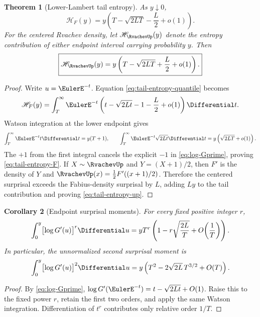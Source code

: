 \documentclass[11pt,oneside]{article}
\newtheorem{theorem}{Theorem}[section]
\newtheorem{corollary}[theorem]{Corollary}
\theoremstyle{definition}
\theoremstyle{remark}
\begin{document}
\begin{theorem}[Lower-Lambert tail entropy]
\label{thm:tail-entropy}
As $y\downarrow0$,
\begin{equation}
 \boxed{
 \mathscr H_F(y)
 =y\left(T-\sqrt{2LT}-\frac L2+o(1)\right).}
 \label{eq:tail-entropy-F}
\end{equation}
For the centered Rvachev density, let $\mathscr H_{\RvachevUp}(y)$ denote the entropy
contribution of either endpoint interval carrying probability $y$.  Then
\begin{equation}
 \boxed{
 \mathscr H_{\RvachevUp}(y)
 =y\left(T-\sqrt{2LT}+\frac L2+o(1)\right).}
 \label{eq:tail-entropy-up}
\end{equation}
\end{theorem}

\begin{proof}
Write $u=\EulerE^{-t}$.  Equation \eqref{eq:tail-entropy-quantile} becomes
\[
 \mathscr H_F(y)=\int_T^\infty \EulerE^{-t}
 \left(t-\sqrt{2Lt}-1-\frac L2+o(1)\right)\Differential t.
\]
Watson integration at the lower endpoint gives
\[
 \int_T^\infty\EulerE^{-t}t\Differential t=y(T+1),
 \qquad
 \int_T^\infty\EulerE^{-t}\sqrt{2Lt}\Differential t
 =y\left(\sqrt{2LT}+o(1)\right).
\]
The $+1$ from the first integral cancels the explicit $-1$ in
\eqref{eq:log-Gprime}, proving \eqref{eq:tail-entropy-F}.  If
$X\sim\RvachevUp$ and $Y=(X+1)/2$, then $F'$ is the density of $Y$ and
$\RvachevUp(x)=\tfrac12F'((x+1)/2)$.  Therefore the centered surprisal exceeds the
Fabius-density surprisal by $L$, adding $Ly$ to the tail contribution and proving
\eqref{eq:tail-entropy-up}.
\end{proof}

\begin{corollary}[Endpoint surprisal moments]
\label{cor:tail-moments}
For every fixed positive integer $r$,
\begin{equation}
 \int_0^y\bigl[\log G'(u)\bigr]^r\Differential u
 =yT^r\left(1-r\sqrt{\frac{2L}{T}}+O\!\left(\frac1T\right)\right).
 \label{eq:tail-surprisal-moments}
\end{equation}
In particular, the unnormalized second surprisal moment is
\begin{equation}
 \int_0^y\bigl[\log G'(u)\bigr]^2\Differential u
 =y\left(T^2-2\sqrt{2L}\,T^{3/2}+O(T)\right).
 \label{eq:tail-second-moment}
\end{equation}
\end{corollary}

\begin{proof}
By \eqref{eq:log-Gprime},
$\log G'(\EulerE^{-t})=t-\sqrt{2Lt}+O(1)$.  Raise this to the fixed power $r$, retain
the first two orders, and apply the same Watson integration.  Differentiation of
$t^r$ contributes only relative order $1/T$.
\end{proof}
\end{document}
